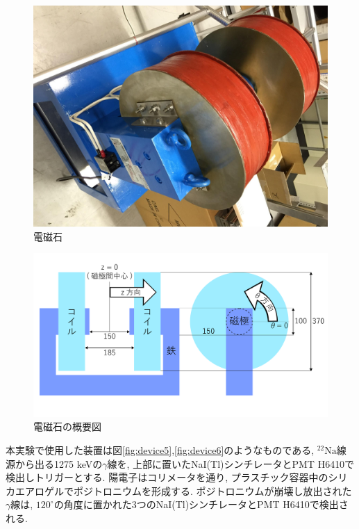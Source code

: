 \begin{figure}[H]
\centering
\includegraphics[keepaspectratio,angle=90,scale=0.4]{fig/ybm/mag.pdf}
\caption{電磁石}
\label{fig:mag}
\end{figure}

\begin{figure}[H]
\centering
\includegraphics[keepaspectratio,scale=0.25]{fig/ybm/magnet.pdf}
\caption{電磁石の概要図}
\label{fig:magnet}
\end{figure}

本実験で使用した装置は図\ref{fig:device5},\ref{fig:device6}のようなものである,
$\mathrm{^{22}Na}$線源から出る1275 keVの$\gamma$線を,
上部に置いたNaI(Tl)シンチレータとPMT H6410で検出しトリガーとする.
陽電子はコリメータを通り,
プラスチック容器中のシリカエアロゲルでポジトロニウムを形成する.
ポジトロニウムが崩壊し放出された$\gamma$線は,
$120^{\circ}$の角度に置かれた3つのNaI(Tl)シンチレータとPMT H6410で検出される.

